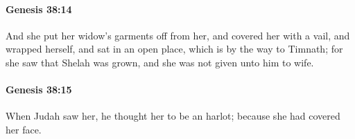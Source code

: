 		\paragraph{Genesis 38:14} %
			\label{GENESIS-38-14}

			And she put her widow's garments off from her, and covered her with a vail, and wrapped herself, and sat in an open place, which is by the way to Timnath; for she saw that Shelah was grown, and she was not given unto him to wife.


		\paragraph{Genesis 38:15} %
			\label{GENESIS-38-15}

			When Judah saw her, he thought her to be an harlot; because she had covered her face.


